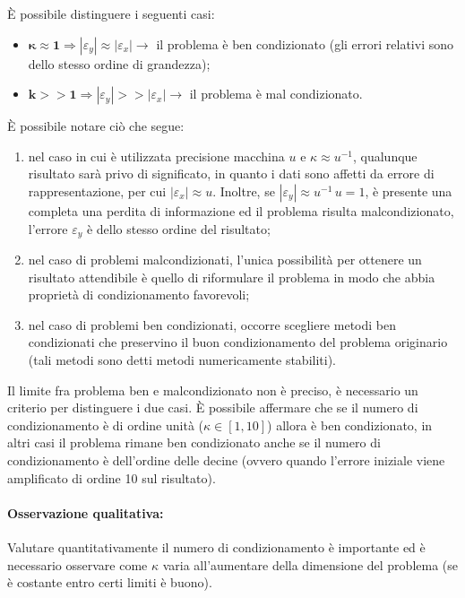 È possibile distinguere i seguenti casi:
\begin{itemize}
	\item $\boldsymbol{\kappa\approx 1}\Rightarrow |\varepsilon_y|\approx|\varepsilon_x|\rightarrow$ il problema è ben condizionato (gli errori relativi sono dello stesso ordine di grandezza);
	\item $\boldsymbol{k>>1}\Rightarrow |\varepsilon_y|>>|\varepsilon_x|\rightarrow$ il problema è mal condizionato.
\end{itemize}

È possibile notare ciò che segue:
\begin{enumerate}
	\item nel caso in cui è utilizzata precisione macchina $u$ e $\kappa\approx u^{-1}$, qualunque risultato sarà privo di significato, in quanto i dati sono affetti da errore di rappresentazione, per cui $|\varepsilon_x|\approx u$. Inoltre, se $|\varepsilon_y|\approx u^{-1}\,u=1$, è presente una completa una perdita di informazione ed il problema risulta malcondizionato, l'errore $\varepsilon_y$ è dello stesso ordine del risultato;
	\item nel caso di problemi malcondizionati, l'unica possibilità per ottenere un risultato attendibile è quello di riformulare il problema in modo che abbia proprietà di condizionamento favorevoli;
	\item nel caso di problemi ben condizionati, occorre scegliere metodi ben condizionati che preservino il buon condizionamento del problema originario (tali metodi sono detti metodi numericamente stabiliti).
\end{enumerate}

Il limite fra problema ben e malcondizionato non è preciso, è necessario un criterio per distinguere i due casi. È possibile affermare che se il numero di condizionamento è di ordine unità ($\kappa\in[1,10]$) allora è ben condizionato, in altri casi il problema rimane ben condizionato anche se il numero di condizionamento è dell'ordine delle decine (ovvero quando l'errore iniziale viene amplificato di ordine 10 sul risultato).

\paragraph{Osservazione qualitativa:} Valutare quantitativamente il numero di condizionamento è importante ed è necessario osservare come $\kappa$ varia all'aumentare della dimensione del problema (se è costante entro certi limiti è buono).

